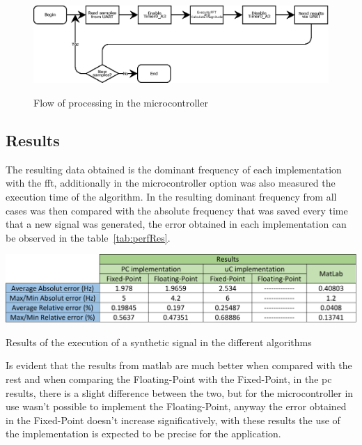 \begin{figure}[]
    \centering
    \includegraphics[width=1\textwidth]{Chapters/6CHP/Figures/uCDataProc.eps}
    \caption{Flow of processing in the microcontroller}{}
    \label{fig:dataProcuC}
\end{figure}
\subsection{Results}
The resulting data obtained is the dominant frequency of each implementation with the \acrshort{fft}, additionally in the microcontroller option was also measured the execution time of the algorithm. In the resulting dominant frequency from all cases was then compared with the absolute frequency that was saved every time that a new signal was generated, the error obtained in each implementation can be observed in the table~\ref{tab:perfRes}.
\begin{table}
    \centering
    \includegraphics[width=1\textwidth]{Chapters/6CHP/Figures/performanceAlgorithm.pdf}
    \caption{Results of the execution of a synthetic signal in the different algorithms}
    \label{tab:perfRes}
\end{table}
Is evident that the results from \acrshort{matlab} are much better when compared with the rest and when comparing the Floating-Point with the Fixed-Point, in the \acrshort{pc} results, there is a slight difference between the two, but for the microcontroller in use wasn't possible to implement the Floating-Point, anyway the error obtained in the Fixed-Point doesn't increase significatively, with these results the use of the implementation is expected to be precise for the application. 

